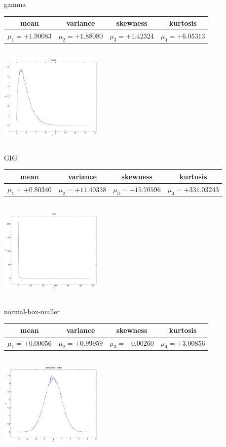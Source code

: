 \documentclass[9pt]{article}
\theoremstyle{plain}
\theoremstyle{definition}
\theoremstyle{remark}
\numberwithin{equation}{section}
\begin{document}
\newpage
gamma \begin{tabular}{|c|c|c|c|}  mean & variance & skewness & kurtosis \\  \hline
$\mu_1 = +1.90083$ & $\mu_2 = +1.88080$ & $\mu_3 = +1.42324$ & $\mu_4 =+6.05313$ \\
\end{tabular}

\includegraphics[width=5cm,height=5cm]{gamma.pdf}

GIG \begin{tabular}{|c|c|c|c|}  mean & variance & skewness & kurtosis \\  \hline
$\mu_1 = +0.80340$ & $\mu_2 = +11.40338$ & $\mu_3 = +15.70596$ & $\mu_4 =+331.03243$ \\
\end{tabular}

\includegraphics[width=5cm,height=5cm]{GIG.pdf}

normal-box-muller \begin{tabular}{|c|c|c|c|}  mean & variance & skewness & kurtosis \\  \hline
$\mu_1 = +0.00056$ & $\mu_2 = +0.99959$ & $\mu_3 = -0.00260$ & $\mu_4 =+3.00856$ \\
\end{tabular}

\includegraphics[width=5cm,height=5cm]{normal-box-muller.pdf}
\end{document}
